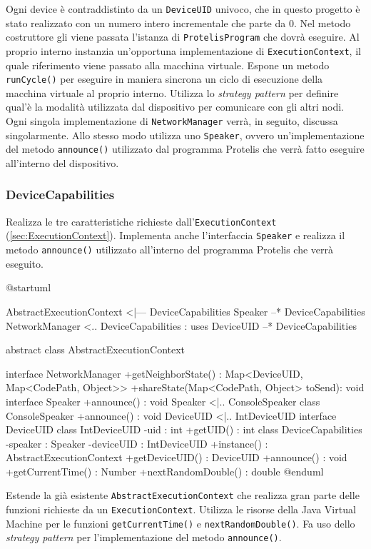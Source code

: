 Ogni device è contraddistinto da un \texttt{DeviceUID} univoco, che in questo
progetto è stato realizzato con un numero intero incrementale che parte da
0. Nel metodo costruttore gli viene passata l'istanza di
\texttt{ProtelisProgram} che dovrà eseguire. Al proprio interno instanzia
un'opportuna implementazione di \texttt{ExecutionContext}, il quale riferimento
viene passato alla macchina virtuale. Espone un metodo \texttt{runCycle()} per
eseguire in maniera sincrona un ciclo di esecuzione della macchina virtuale al
proprio interno. Utilizza lo \textit{strategy pattern} per definire qual'è la
modalità utilizzata dal dispositivo per comunicare con gli altri nodi. Ogni
singola implementazione di \texttt{NetworkManager} verrà, in seguito, discussa
singolarmente. Allo stesso modo utilizza uno \texttt{Speaker}, ovvero
un'implementazione del metodo \texttt{announce()} utilizzato dal programma
Protelis che verrà fatto eseguire all'interno del dispositivo.

\subsubsection{DeviceCapabilities}
Realizza le tre caratteristiche richieste
dall'\texttt{ExecutionContext} (\ref{sec:ExecutionContext}). Implementa anche
l'interfaccia \texttt{Speaker} e realizza il metodo \texttt{announce()}
utilizzato all'interno del programma Protelis che verrà eseguito.

\begin{center}
  \begin{plantuml}
    @startuml

    AbstractExecutionContext <|--- DeviceCapabilities
    Speaker --* DeviceCapabilities
    NetworkManager <.. DeviceCapabilities : uses
    DeviceUID --* DeviceCapabilities

    abstract class AbstractExecutionContext {

    }
    interface NetworkManager {
      +getNeighborState() : Map<DeviceUID, Map<CodePath, Object>>
      +shareState(Map<CodePath, Object> toSend): void
    }
    interface Speaker {
      +announce() : void
    }
    Speaker <|.. ConsoleSpeaker
    class ConsoleSpeaker {
      +announce() : void
    }
    DeviceUID <|.. IntDeviceUID
    interface DeviceUID
    class IntDeviceUID {
      -uid : int
      +getUID() : int
    }
    class DeviceCapabilities {
      -speaker : Speaker
      -deviceUID : IntDeviceUID
      +instance() : AbstractExecutionContext
      +getDeviceUID() : DeviceUID
      +announce() : void
      +getCurrentTime() : Number
      +nextRandomDouble() : double
    }
    @enduml
  \end{plantuml}
\end{center}

Estende la già esistente \texttt{AbstractExecutionContext} che realizza gran
parte delle funzioni richieste da un \texttt{ExecutionContext}. Utilizza le
risorse della Java Virtual Machine per le funzioni \texttt{getCurrentTime()} e
\texttt{nextRandomDouble()}.  Fa uso dello \textit{strategy pattern} per
l'implementazione del metodo \texttt{announce()}.
